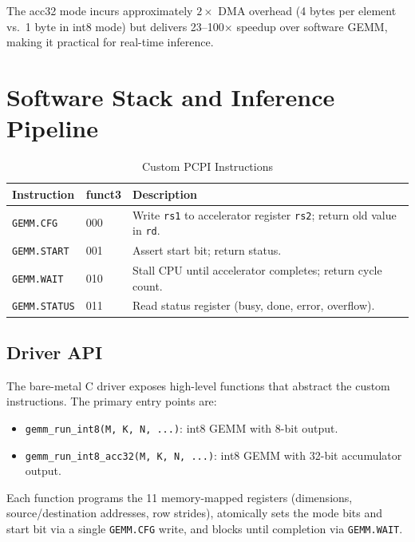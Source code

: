\documentclass[conference]{IEEEtran}
\begin{document}
The acc32 mode incurs approximately $2\times$ DMA overhead (4 bytes per element vs.\ 1 byte in int8 mode) but delivers 23--100$\times$ speedup over software GEMM, making it practical for real-time inference.

\section{Software Stack and Inference Pipeline}
\label{sec:software}

\begin{table}[t]
\centering
\caption{Custom PCPI Instructions}
\label{tab:instructions}
\begin{tabular}{@{}llp{4.2cm}@{}}
\toprule
\textbf{Instruction} & \textbf{funct3} & \textbf{Description} \\
\midrule
\texttt{GEMM.CFG}    & 000 & Write \texttt{rs1} to accelerator register \texttt{rs2}; return old value in \texttt{rd}. \\
\texttt{GEMM.START}  & 001 & Assert start bit; return status. \\
\texttt{GEMM.WAIT}   & 010 & Stall CPU until accelerator completes; return cycle count. \\
\texttt{GEMM.STATUS} & 011 & Read status register (busy, done, error, overflow). \\
\bottomrule
\end{tabular}
\end{table}

\subsection{Driver API}

The bare-metal C driver exposes high-level functions that abstract the custom instructions. The primary entry points are:
\begin{itemize}
    \item \texttt{gemm\_run\_int8(M, K, N, ...)}: int8 GEMM with 8-bit output.
    \item \texttt{gemm\_run\_int8\_acc32(M, K, N, ...)}: int8 GEMM with 32-bit accumulator output.
\end{itemize}
Each function programs the 11 memory-mapped registers (dimensions, source/destination addresses, row strides), atomically sets the mode bits and start bit via a single \texttt{GEMM.CFG} write, and blocks until completion via \texttt{GEMM.WAIT}.
\end{document}
